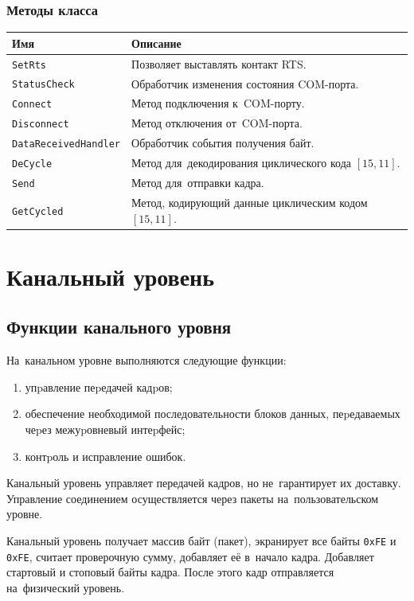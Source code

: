 \documentclass[a4paper,12pt]{article}
\begin{document}
\subsubsection*{Методы класса}
\begin{center}
\begin{longtabu} to \linewidth {|X|X[2.6]|}
\hline
\textbf{Имя}	&	\textbf{Описание}\\\hline\endhead
\texttt{SetRts}	&	Позволяет выставлять контакт RTS.\\\hline
\texttt{StatusCheck}	&	Обработчик изменения состояния COM-порта.\\\hline
\texttt{Connect}	&	Метод подключения к~COM-порту.\\\hline
\texttt{Disconnect}	&	Метод отключения от~COM-порта.\\\hline
\texttt{DataReceivedHandler}	&	Обработчик события получения байт.\\\hline
\texttt{DeCycle}	&	Метод для~декодирования циклического кода $[15,11]$.\\\hline
\texttt{Send}	&	Метод для~отправки кадра.\\\hline
\texttt{GetCycled}	&	Метод, кодирующий данные циклическим кодом $[15,11]$.\\\hline
\end{longtabu}
\end{center}

\section{Канальный уровень}
\subsection{Функции канального уровня}
На~канальном уровне выполняются следующие функции:
\begin{enumerate}
\item упpавление пеpедачей кадpов;
\item обеспечение необходимой последовательности блоков данных, пеpедаваемых чеpез межуpовневый интеpфейс;
\item контpоль и исправление ошибок.
\end{enumerate}

Канальный уровень управляет передачей кадров, но не~гарантирует их доставку. Управление соединением осуществляется через пакеты на~пользовательском уровне.

Канальный уровень получает массив байт (пакет), экранирует все байты \texttt{0xFE} и \texttt{0xFE}, считает проверочную сумму, добавляет её в~начало кадра. Добавляет стартовый и стоповый байты кадра. После этого кадр отправляется на~физический уровень.
\end{document}
